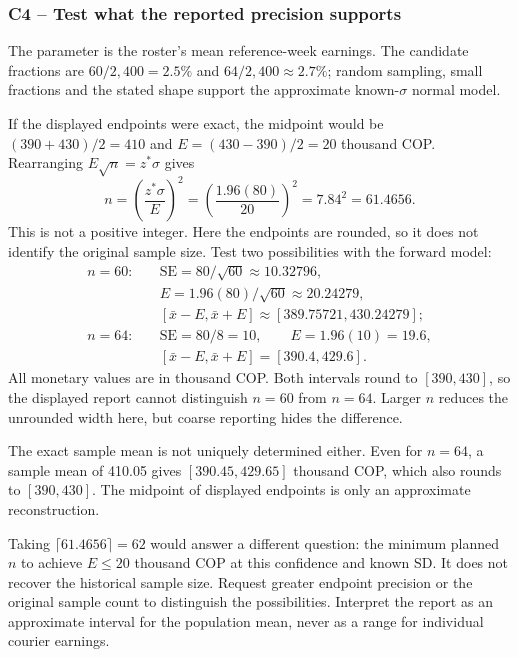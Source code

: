 \subsubsection*{C4 -- Test what the reported precision supports}\label{sol:c4-advanced-2}
The parameter is the roster's mean reference-week earnings. The candidate fractions are $60/2{,}400=2.5\%$ and $64/2{,}400\approx2.7\%$; random sampling, small fractions and the stated shape support the approximate known-$\sigma$ normal model.

If the displayed endpoints were exact, the midpoint would be $(390+430)/2=410$ and $E=(430-390)/2=20$ thousand COP. Rearranging $E\sqrt n=z^*\sigma$ gives
\[
n=\left(\frac{z^*\sigma}{E}\right)^2
=\left(\frac{1.96(80)}{20}\right)^2
=7.84^2=61.4656.
\]
This is not a positive integer. Here the endpoints are rounded, so it does not identify the original sample size. Test two possibilities with the forward model:
\[
\begin{aligned}
n=60:\quad &\mathrm{SE}=80/\sqrt{60}\approx10.32796,\\
&E=1.96(80)/\sqrt{60}\approx20.24279,\\
&[\bar x-E,\bar x+E]\approx[389.75721,430.24279];\\[3pt]
n=64:\quad &\mathrm{SE}=80/8=10,\qquad E=1.96(10)=19.6,\\
&[\bar x-E,\bar x+E]=[390.4,429.6].
\end{aligned}
\]
All monetary values are in thousand COP. Both intervals round to $[390,430]$, so the displayed report cannot distinguish $n=60$ from $n=64$. Larger $n$ reduces the unrounded width here, but coarse reporting hides the difference.

The exact sample mean is not uniquely determined either. Even for $n=64$, a sample mean of 410.05 gives $[390.45,429.65]$ thousand COP, which also rounds to $[390,430]$. The midpoint of displayed endpoints is only an approximate reconstruction.

Taking $\lceil61.4656\rceil=62$ would answer a different question: the minimum planned $n$ to achieve $E\leq20$ thousand COP at this confidence and known SD. It does not recover the historical sample size. Request greater endpoint precision or the original sample count to distinguish the possibilities. Interpret the report as an approximate interval for the population mean, never as a range for individual courier earnings.

